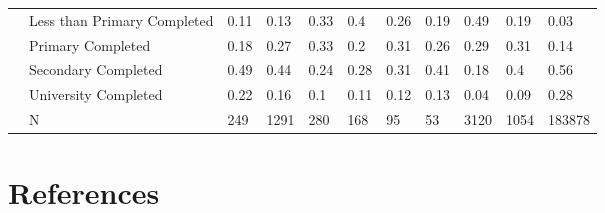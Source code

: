 \documentclass[
]{article}
\begin{document}
\begin{landscape}
\begin{table}[ht]
{\begin{tabular}{l|l|lllllllll}
   & Less than Primary Completed & 0.11 & 0.13 & 0.33 & 0.4 & 0.26 & 0.19 & 0.49 & 0.19 & 0.03 \\ 
   & Primary Completed & 0.18 & 0.27 & 0.33 & 0.2 & 0.31 & 0.26 & 0.29 & 0.31 & 0.14 \\ 
   & Secondary Completed & 0.49 & 0.44 & 0.24 & 0.28 & 0.31 & 0.41 & 0.18 & 0.4 & 0.56 \\ 
   & University Completed & 0.22 & 0.16 & 0.1 & 0.11 & 0.12 & 0.13 & 0.04 & 0.09 & 0.28 \\ 
   & N & 249 & 1291 & 280 & 168 & 95 & 53 & 3120 & 1054 & 183878 \\ 
   \hline
\end{tabular}
\endgroup
\end{table}
\end{landscape}

\newpage

\section*{References}\label{references}
\end{document}
